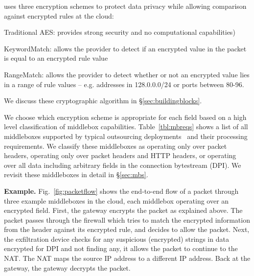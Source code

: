 \sys uses three encryption schemes to protect data privacy while allowing comparison against encrypted rules at the cloud: 
\begin{myitemize}
\item Traditional AES: provides strong security and no computational capabilities)
\item KeywordMatch:  allows the provider to detect if an encrypted value in the packet is equal to an encrypted rule value
\item RangeMatch: allows the provider to detect whether or not an encrypted value lies in a range of rule values -- e.g. addresses in 128.0.0.0/24 or ports between 80-96.
\end{myitemize}
We discuss these cryptographic algorithm in \S\ref{sec:buildingblocks}.

We choose which encryption scheme is appropriate for each field based on a high level classification of middlebox capabilities.
Table~\ref{tbl:mbreqs} shows a list of all middleboxes supported by typical outsourcing deployments~\cite{aplomb} and their processing requirements.
We classify these middleboxes as operating only over packet headers, operating only over packet headers and HTTP headers, or operating over all data including arbitrary fields in the connection bytestream (DPI).
We revisit these middleboxes in detail in \S\ref{sec:mbs}.


{\bf Example.} Fig.~\ref{fig:packetflow} shows the end-to-end flow of a packet through three example middleboxes in the cloud, each middlebox operating over an encrypted field.  
First,  the gateway encrypts the packet as explained above. The packet passes through the firewall which tries to match the encrypted information from the header against its encrypted rule, and decides to allow the packet. Next, the exfiltration device checks for any suspicious (encrypted) strings in data encrypted for DPI and not finding any, it allows the packet  to continue to the NAT. The NAT maps the source IP address to a different IP address. Back at the gateway, the gateway decrypts the packet. 



